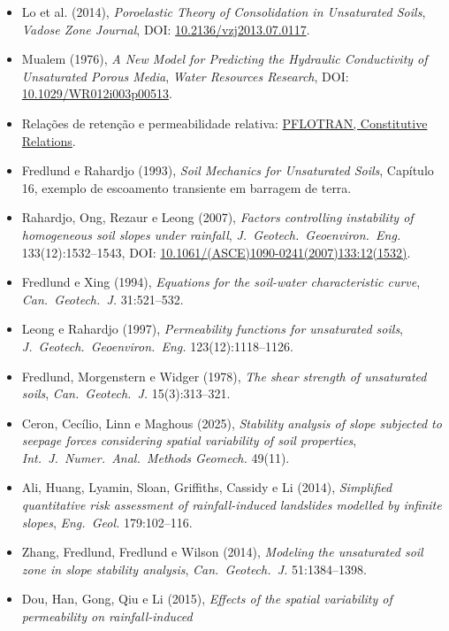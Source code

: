\documentclass[11pt,a4paper]{article}
\numberwithin{equation}{section}
\begin{document}
\begin{itemize}
\item Lo et al. (2014), \emph{Poroelastic Theory of Consolidation in Unsaturated Soils},
\emph{Vadose Zone Journal}, DOI: \href{https://doi.org/10.2136/vzj2013.07.0117}{10.2136/vzj2013.07.0117}.
\item Mualem (1976), \emph{A New Model for Predicting the Hydraulic Conductivity of Unsaturated Porous Media},
\emph{Water Resources Research}, DOI: \href{https://doi.org/10.1029/WR012i003p00513}{10.1029/WR012i003p00513}.
\item Rela\c{c}\~oes de reten\c{c}\~ao e permeabilidade relativa:
\href{https://documentation.pflotran.org/theory_guide/constitutive_relations.html}{PFLOTRAN, Constitutive Relations}.
\item Fredlund e Rahardjo (1993), \emph{Soil Mechanics for Unsaturated Soils},
Cap\'itulo 16, exemplo de escoamento transiente em barragem de terra.
\item Rahardjo, Ong, Rezaur e Leong (2007), \emph{Factors controlling instability of homogeneous soil slopes under
rainfall}, \emph{J.\ Geotech.\ Geoenviron.\ Eng.} 133(12):1532--1543,
DOI: \href{https://doi.org/10.1061/(ASCE)1090-0241(2007)133:12(1532)}{10.1061/(ASCE)1090-0241(2007)133:12(1532)}.
\item Fredlund e Xing (1994), \emph{Equations for the soil-water characteristic curve}, \emph{Can.\ Geotech.\ J.}
31:521--532.
\item Leong e Rahardjo (1997), \emph{Permeability functions for unsaturated soils}, \emph{J.\ Geotech.\
Geoenviron.\ Eng.} 123(12):1118--1126.
\item Fredlund, Morgenstern e Widger (1978), \emph{The shear strength of unsaturated soils}, \emph{Can.\ Geotech.\
J.} 15(3):313--321.
\item Ceron, Cec\'ilio, Linn e Maghous (2025), \emph{Stability analysis of slope subjected to seepage forces
considering spatial variability of soil properties}, \emph{Int.\ J.\ Numer.\ Anal.\ Methods Geomech.} 49(11).
\item Ali, Huang, Lyamin, Sloan, Griffiths, Cassidy e Li (2014), \emph{Simplified quantitative risk assessment of
rainfall-induced landslides modelled by infinite slopes}, \emph{Eng.\ Geol.} 179:102--116.
\item Zhang, Fredlund, Fredlund e Wilson (2014), \emph{Modeling the unsaturated soil zone in slope stability analysis},
\emph{Can.\ Geotech.\ J.} 51:1384--1398.
\item Dou, Han, Gong, Qiu e Li (2015), \emph{Effects of the spatial variability of permeability on rainfall-induced
}
\end{itemize}
\end{document}
